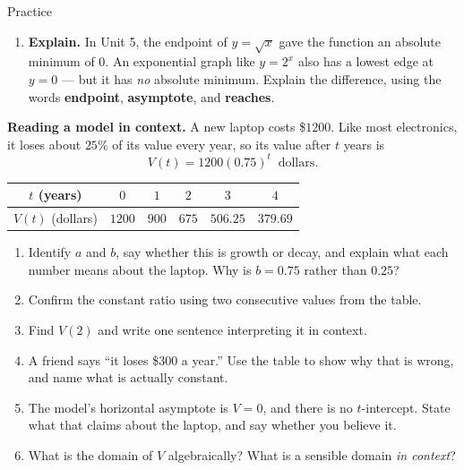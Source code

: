 \documentclass[10pt]{article}
\begin{document}
\begin{notesbox}{Practice}
\begin{enumerate}[leftmargin=1.9em, itemsep=12pt]
  \item \textbf{Explain.} In Unit 5, the endpoint of $y=\sqrt{x}$ gave the function an absolute
        minimum of $0$. An exponential graph like $y=2^{x}$ also has a lowest edge at $y=0$ --- but
        it has \emph{no} absolute minimum. Explain the difference, using the words
        \textbf{endpoint}, \textbf{asymptote}, and \textbf{reaches}.
\end{enumerate}
\end{notesbox}

\begin{extensionbox}
\textbf{Reading a model in context.} A new laptop costs \$$1200$. Like most electronics, it loses
about $25\%$ of its value every year, so its value after $t$ years is
\[
  V(t) = 1200(0.75)^{t} \ \text{ dollars.}
\]
\begin{center}
\renewcommand{\arraystretch}{1.25}
\begin{tabular}{|c|c|c|c|c|c|}
\hline
$t$ (years) & $0$ & $1$ & $2$ & $3$ & $4$ \\ \hline
$V(t)$ (dollars) & $1200$ & $900$ & $675$ & $506.25$ & $379.69$ \\ \hline
\end{tabular}
\end{center}
\begin{enumerate}[label=(\alph*), leftmargin=1.8em, itemsep=5pt]
  \item Identify $a$ and $b$, say whether this is growth or decay, and explain what each number means
        about the laptop. Why is $b=0.75$ rather than $0.25$?
  \item Confirm the constant ratio using two consecutive values from the table.
  \item Find $V(2)$ and write one sentence interpreting it in context.
  \item A friend says ``it loses \$$300$ a year.'' Use the table to show why that is wrong, and name
        what is actually constant.
  \item The model's horizontal asymptote is $V=0$, and there is no $t$-intercept. State what that
        claims about the laptop, and say whether you believe it.
  \item What is the domain of $V$ algebraically? What is a sensible domain \emph{in context}?
\end{enumerate}
\end{extensionbox}
\end{document}
